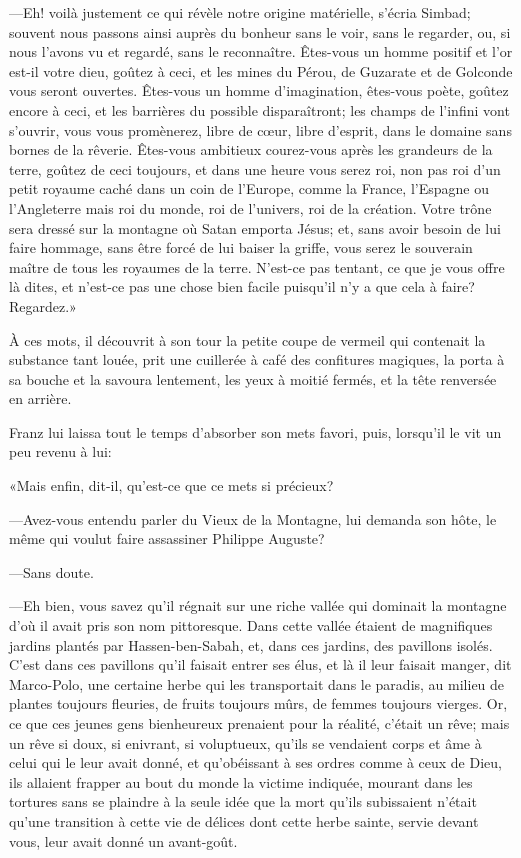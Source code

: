 —Eh! voilà justement ce qui révèle notre origine matérielle, s'écria Simbad; souvent nous passons ainsi auprès du bonheur sans le voir, sans le regarder, ou, si nous l'avons vu et regardé, sans le reconnaître. Êtes-vous un homme positif et l'or est-il votre dieu, goûtez à ceci, et les mines du Pérou, de Guzarate et de Golconde vous seront ouvertes. Êtes-vous un homme d'imagination, êtes-vous poète, goûtez encore à ceci, et les barrières du possible disparaîtront; les champs de l'infini vont s'ouvrir, vous vous promènerez, libre de cœur, libre d'esprit, dans le domaine sans bornes de la rêverie. Êtes-vous ambitieux courez-vous après les grandeurs de la terre, goûtez de ceci toujours, et dans une heure vous serez roi, non pas roi d'un petit royaume caché dans un coin de l'Europe, comme la France, l'Espagne ou l'Angleterre mais roi du monde, roi de l'univers, roi de la création. Votre trône sera dressé sur la montagne où Satan emporta Jésus; et, sans avoir besoin de lui faire hommage, sans être forcé de lui baiser la griffe, vous serez le souverain maître de tous les royaumes de la terre. N'est-ce pas tentant, ce que je vous offre là dites, et n'est-ce pas une chose bien facile puisqu'il n'y a que cela à faire? Regardez.»

À ces mots, il découvrit à son tour la petite coupe de vermeil qui contenait la substance tant louée, prit une cuillerée à café des confitures magiques, la porta à sa bouche et la savoura lentement, les yeux à moitié fermés, et la tête renversée en arrière.

Franz lui laissa tout le temps d'absorber son mets favori, puis, lorsqu'il le vit un peu revenu à lui:

«Mais enfin, dit-il, qu'est-ce que ce mets si précieux?

—Avez-vous entendu parler du Vieux de la Montagne, lui demanda son hôte, le même qui voulut faire assassiner Philippe Auguste?

—Sans doute.

—Eh bien, vous savez qu'il régnait sur une riche vallée qui dominait la montagne d'où il avait pris son nom pittoresque. Dans cette vallée étaient de magnifiques jardins plantés par Hassen-ben-Sabah, et, dans ces jardins, des pavillons isolés. C'est dans ces pavillons qu'il faisait entrer ses élus, et là il leur faisait manger, dit Marco-Polo, une certaine herbe qui les transportait dans le paradis, au milieu de plantes toujours fleuries, de fruits toujours mûrs, de femmes toujours vierges. Or, ce que ces jeunes gens bienheureux prenaient pour la réalité, c'était un rêve; mais un rêve si doux, si enivrant, si voluptueux, qu'ils se vendaient corps et âme à celui qui le leur avait donné, et qu'obéissant à ses ordres comme à ceux de Dieu, ils allaient frapper au bout du monde la victime indiquée, mourant dans les tortures sans se plaindre à la seule idée que la mort qu'ils subissaient n'était qu'une transition à cette vie de délices dont cette herbe sainte, servie devant vous, leur avait donné un avant-goût.

